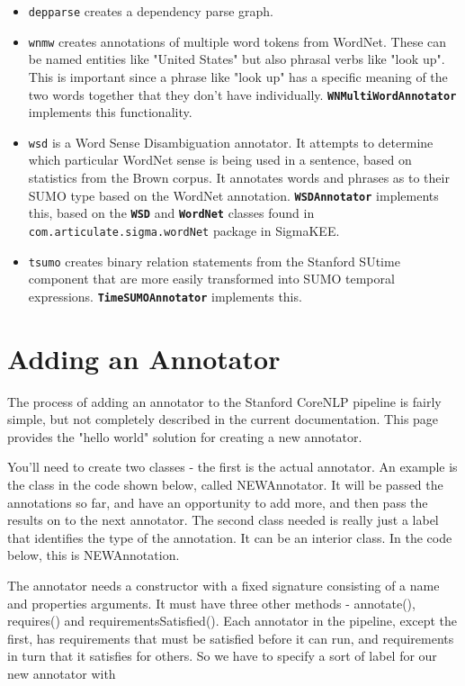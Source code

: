 \documentclass{book}
\newcommand{\tsumo}[1]{{\small \textbf{\texttt{#1}}}}
\begin{document}
\begin{itemize}
\item \texttt{depparse} creates a dependency parse graph.  

\item \texttt{wnmw} creates annotations of multiple word tokens from WordNet.
These can be named entities like "United States" but also phrasal verbs like
"look up".  This is important since a phrase like "look up" has a specific
meaning of the two words together that they don't have individually.
\tsumo{WNMultiWordAnnotator} implements
this functionality.

\item \texttt{wsd} is a Word Sense Disambiguation annotator.  It attempts to
determine which particular WordNet sense is being used in a sentence, based
on statistics from the Brown corpus.  It annotates words and phrases as to
their SUMO type based on the WordNet annotation.
\tsumo{WSDAnnotator} implements this, based on
the \tsumo{WSD} and \tsumo{WordNet}
classes found in \texttt{com.articulate.sigma.wordNet} package in SigmaKEE.

\item \texttt{tsumo} creates binary relation statements from the Stanford SUtime
component that are more easily transformed into SUMO temporal expressions.
\tsumo{TimeSUMOAnnotator} implements this.

\end{itemize}

\section{Adding an Annotator}

The process of adding an annotator to the Stanford CoreNLP pipeline is fairly
simple, but not completely described in the current documentation. This page
provides the "hello world" solution for creating a new annotator.

You'll need to create two classes - the first is the actual annotator. An
example is the class in the code shown below, called NEWAnnotator. It will be
passed the annotations so far, and have an opportunity to add more, and then
pass the results on to the next annotator. The second class needed is really
just a label that identifies the type of the annotation. It can be an interior
class. In the code below, this is NEWAnnotation.

The annotator needs a constructor with a fixed signature consisting of a name
and properties arguments. It must have three other methods - annotate(),
requires() and requirementsSatisfied(). Each annotator in the pipeline, except
the first, has requirements that must be satisfied before it can run, and
requirements in turn that it satisfies for others. So we have to specify a sort
of label for our new annotator with
\end{document}
